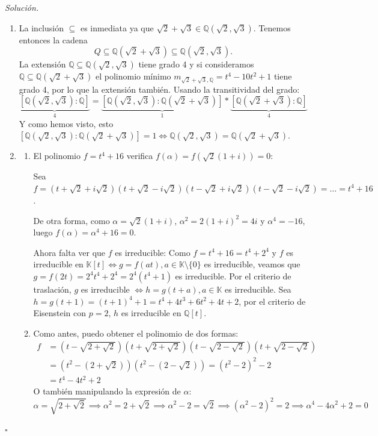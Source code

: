 \documentclass[10pt, spanish]{report}
\theoremstyle{definition}
\newenvironment{sol}{\textit{Solución.}}{\hfill$\square$}
\newcommand{\Q}{\mathbb{Q}}
\newcommand{\K}{\mathbb{K}}
\newcommand{\fecha}[1]{\marginpar{\underline{\footnotesize{#1}}}}
\begin{document}
\fecha{25/02}
\begin{sol}
    \begin{enumerate}
        \item La inclusión $\subseteq$ es inmediata ya que $\sqrt{2}+\sqrt{3}\in
            \Q(\sqrt{2},\sqrt{3})$. Tenemos entonces la cadena
            \[Q\subseteq\Q(\sqrt{2}+\sqrt{3})\subseteq\Q(\sqrt{2},\sqrt{3}).\]
            La extensión $\Q\subseteq\Q(\sqrt{2},\sqrt{3})$ tiene grado 4 y si
            consideramos $\Q\subseteq\Q(\sqrt{2}+\sqrt{3})$ el polinomio mínimo
            $m_{\sqrt{2}+\sqrt{3},\Q}=t^4-10t^2+1$ tiene grado 4, por lo que la
            extensión también. Usando la transitividad del grado:
            \[\underbrace{[\Q(\sqrt{2},\sqrt{3}):\Q]}_{4}=
                \underbrace{[\Q(\sqrt{2},\sqrt{3}):\Q(\sqrt{2}+\sqrt{3})]}_{1}*
                \underbrace{[\Q(\sqrt{2}+\sqrt{3}):\Q]}_{4}\]
                Y como hemos visto, esto
                $[\Q(\sqrt{2},\sqrt{3}):\Q(\sqrt{2}+\sqrt{3})]=1\Leftrightarrow
                \Q(\sqrt{2},\sqrt{3})=\Q(\sqrt{2}+\sqrt{3})$.
        \item
            \begin{enumerate}
                \item El polinomio $f=t^4+16$ verifica $f(\alpha)=
                    f(\sqrt{2}(1+i))=0$:

                    Sea $f=(t+\sqrt{2}+i\sqrt{2})(t+\sqrt{2}-i\sqrt{2})
                    (t-\sqrt{2}+i\sqrt{2})(t-\sqrt{2}-i\sqrt{2})=\ldots=t^4+16$.

                    De otra forma, como $\alpha=\sqrt{2}(1+i)$,
                    $\alpha^2=2(1+i)^2=4i$ y $\alpha^4=-16$, luego
                    $f(\alpha)=\alpha^4+16=0$.

                    Ahora falta ver que $f$ es irreducible:
                    Como $f=t^4+16=t^4+2^4$ y $f$ es irreducible en $\K[t]
                    \Leftrightarrow g=f(at), a\in \K\setminus\{0\}$ es
                    irreducible, veamos que $g=f(2t)=2^4t^4+2^4=2^4(t^4+1)$ es
                    irreducible. Por el criterio de traslación, $g$ es
                    irreducible $\Leftrightarrow h=g(t+a), a\in\K$ es
                    irreducible. Sea $h=g(t+1)=(t+1)^4+1=t^4+4t^3+6t^2+4t+2$,
                    por el criterio de Eisenstein con $p=2$, $h$ es irreducible
                    en $\Q[t]$.
                \item Como antes, puedo obtener el polinomio de dos formas:
                    \begin{align*}
                        f&=(t-\sqrt{2+\sqrt{2}})(t+\sqrt{2+\sqrt{2}})
                        (t-\sqrt{2-\sqrt{2}})(t+\sqrt{2-\sqrt{2}})\\
                         &=(t^2-(2+\sqrt{2}))(t^2-(2-\sqrt{2}))=(t^2-2)^2-2\\
                         &=t^4-4t^2+2
                    \end{align*}
                    O también manipulando la expresión de $\alpha$:
                    \[\alpha=\sqrt{2+\sqrt{2}}\implies\alpha^2=2+\sqrt{2}
                     \implies\alpha^2-2=\sqrt{2}\implies(\alpha^2-2)^2=2\implies
                     \alpha^4-4\alpha^2+2=0\]


\end{enumerate}
\end{enumerate}
\end{sol}
\end{document}
